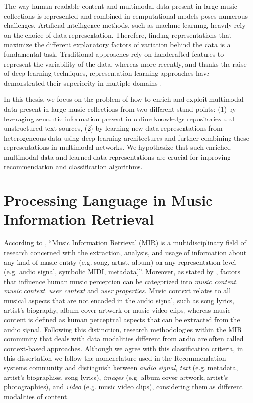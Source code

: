 The way human readable content and multimodal data present in large music collections is represented and combined in computational models poses numerous challenges. Artificial intelligence methods, such as machine learning, heavily rely on the choice of data representation. Therefore, finding representations that maximize the different explanatory factors of variation behind the data is a fundamental task. Traditional approaches rely on handcrafted features to represent the variability of the data, whereas more recently, and thanks the raise of deep learning techniques, representation-learning approaches have demonstrated their superiority in multiple domains \citep{bengio2013representation}.

In this thesis, we focus on the problem of how to enrich and exploit multimodal data present in large music collections from two different stand points: (1) by leveraging semantic information present in online knowledge repositories and unstructured text sources, (2) by learning new data representations from heterogeneous data using deep learning architectures and further combining these representations in multimodal networks. %
We hypothesize that such enriched multimodal data and learned data representations are crucial for improving recommendation and classification algorithms. %


\section{Processing Language in Music Information Retrieval}
\label{sec:intro:nlp}

According to \citep{schedl2008}, ``Music Information Retrieval (MIR) is a multidisciplinary field of research concerned with the extraction, analysis, and usage of information about any kind of music entity (e.g. song, artist, album) on any representation level (e.g. audio signal, symbolic MIDI, metadata)''. Moreover, as stated by \cite{Schedl2013}, factors that influence human music perception can be categorized into \textit{music content}, \textit{music context}, \textit{user context} and \textit{user properties}. Music context relates to all musical aspects that are not encoded in the audio signal, such as song lyrics, artist's biography, album cover artwork or music video clips, whereas music content is defined as human perceptual aspects that can be extracted from the audio signal. Following this distinction, research methodologies within the MIR community that deals with data modalities different from audio are often called context-based approaches. 
Although we agree with this classification criteria, in this dissertation we follow the nomenclature used in the Recommendation systems community \citep{Ostuni2013} and distinguish between \textit{audio signal}, \textit{text} (e.g. metadata, artist's biographies, song lyrics), \textit{images} (e.g. album cover artwork, artist's photographies), and \textit{video} (e.g. music video clips), considering them as different modalities of content.

